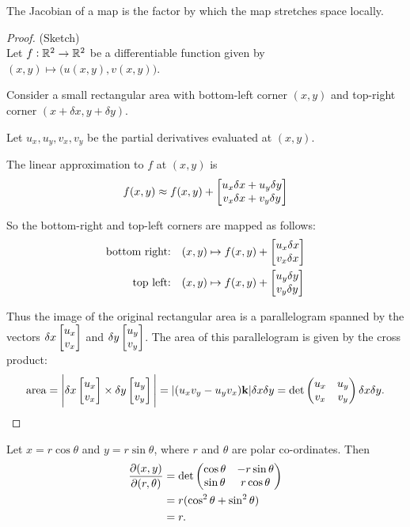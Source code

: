 \begin{theorem}\label{stretch-factor-is-jacobian}
  The Jacobian of a map is the factor by which the map stretches space locally.
\end{theorem}

\begin{proof}(Sketch)\\
  Let $f: \mathbb{R}^2\to\mathbb{R}^2$ be a differentiable function given by
  $(x,y) \mapsto \Big(u(x,y), v(x,y)\Big)$.

  Consider a small rectangular area with bottom-left corner $(x, y)$ and top-right corner
  $(x + \delta x, y + \delta y)$.

  Let $u_x, u_y, v_x, v_y$ be the partial derivatives evaluated at $(x, y)$.

  The linear approximation to $f$ at $(x, y)$ is
  \begin{align*}
    f(x, y) \approx  f(x, y) +
    \begin{bmatrix}u_x\delta x + u_y\delta y\\v_x\delta x + v_y\delta y\end{bmatrix}
  \end{align*}

  So the bottom-right and top-left corners are mapped as follows:
  \begin{align*}
    \text{bottom right:~~~}&
                             (x, y) \mapsto f(x, y) +
                             \begin{bmatrix}u_x\delta x\\v_x\delta x\end{bmatrix}
    \\
    \text{top left:~~~}&
                         (x, y) \mapsto f(x, y) +
                         \begin{bmatrix}u_y\delta y\\v_y\delta y\end{bmatrix}
  \end{align*}

  Thus the image of the original rectangular area is a parallelogram spanned by the vectors
  $\delta x\begin{bmatrix}u_x\\v_x\end{bmatrix}$ and $\delta y\begin{bmatrix}u_y\\v_y\end{bmatrix}$. The area of this parallelogram is given by
  the cross product:
  \begin{align*}
    \text{area}
    = \Bigg|\delta x\begin{bmatrix}u_x\\v_x\end{bmatrix} \times
    \delta y\begin{bmatrix}u_y\\v_y\end{bmatrix}\Bigg|
    = |(u_xv_y - u_yv_x)\mathbf{k}|\delta x \delta y
    = \det \begin{pmatrix}u_x & u_y\\v_x & v_y\\ \end{pmatrix} \delta x \delta y.
  \end{align*}


\end{proof}


\begin{example*}
  Let $x = r\cos\theta$ and $y = r\sin\theta$, where $r$ and $\theta$ are polar co-ordinates. Then
  \begin{align*}
    \frac{\partial(x, y)}{\partial(r, \theta)}
    &= \det \begin{pmatrix}\cos\theta & -r\sin\theta\\\sin\theta & r\cos\theta\\ \end{pmatrix}\\
    &= r(\cos^2\theta + \sin^2\theta)\\
    &= r.
  \end{align*}
\end{example*}

